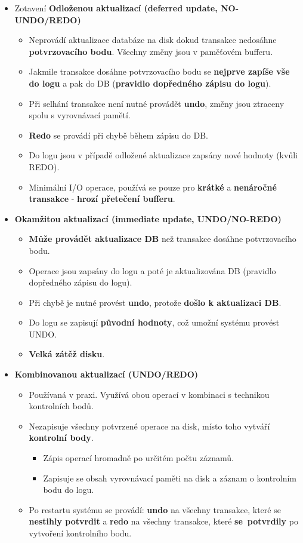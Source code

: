 \begin{itemize}
\item Zotavení \textbf{Odloženou aktualizací (deferred update, NO-UNDO/REDO)}
\begin{itemize}
\item Neprovádí aktualizace databáze na disk dokud transakce nedosáhne\textbf{ potvrzovacího bodu}. Všechny změny jsou v paměťovém bufferu.
\item Jakmile transakce dosáhne potvrzovacího bodu se \textbf{nejprve zapíše vše do logu} a pak do DB (\textbf{pravidlo dopředného zápisu do logu}).
\item Při selhání transakce není nutné provádět \textbf{undo}, změny jsou ztraceny spolu s vyrovnávací pamětí.
\item \textbf{Redo} se provádí při chybě během zápisu do DB.
\item Do logu jsou v případě odložené aktualizace zapsány nové hodnoty (kvůli REDO).
\item Minimální I/O operace, používá se pouze pro \textbf{krátké} a \textbf{nenáročné transakce} - \textbf{hrozí přetečení bufferu}.
\end{itemize}
\item\textbf{Okamžitou aktualizací (immediate update, UNDO/NO-REDO)}
\begin{itemize}
\item \textbf{Může provádět aktualizace DB} než transakce dosáhne potvrzovacího bodu.
\item Operace jsou zapsány do logu a poté je aktualizována DB (pravidlo dopředného zápisu do logu).
\item Při chybě je nutné provést \textbf{undo}, protože \textbf{došlo k aktualizaci DB}.
\item Do logu se zapisují \textbf{původní hodnoty}, což umožní systému provést UNDO.
\item \textbf{Velká zátěž disku}.
\end{itemize}
\item\textbf{Kombinovanou aktualizací (UNDO/REDO)}
\begin{itemize}
\item Používaná v praxi. Využívá obou operací v kombinaci s technikou kontrolních bodů.
\item Nezapisuje všechny potvrzené operace na disk, místo toho vytváří \textbf{kontrolní body}.
\begin{itemize}
\item Zápis operací hromadně po určitém počtu záznamů.
\item Zapisuje se obsah vyrovnávací paměti na disk a záznam o kontrolním bodu do logu.
\end{itemize}
\item Po restartu systému se provádí: \textbf{undo} na všechny transakce, které se \textbf{nestihly potvrdit} a \textbf{redo} na všechny transakce, které \textbf{se potvrdily} po vytvoření kontrolního bodu.
\end{itemize}
\end{itemize}

